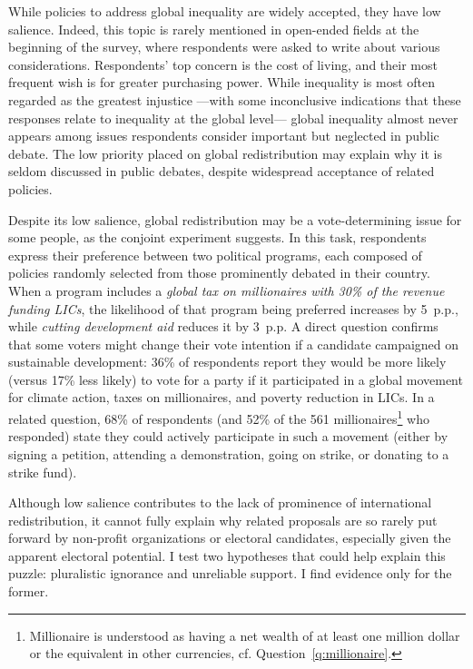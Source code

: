 \documentclass[12pt,english]{article}
\begin{document}
\begin{bibunit}
While policies to address global inequality are widely accepted, they have low salience. Indeed, this topic is rarely mentioned in open-ended fields at the beginning of the survey, where respondents were asked to write about various considerations. Respondents' top concern is the cost of living, and their most frequent wish is for greater purchasing power. While inequality is most often regarded as the greatest injustice ---with some inconclusive indications that these responses relate to inequality at the global level--- global inequality almost never appears among issues respondents consider important but neglected in public debate. The low priority placed on global redistribution may explain why it is seldom discussed in public debates, despite widespread acceptance of related policies.

Despite its low salience, global redistribution may be a vote-determining issue for some people, as %
the conjoint experiment suggests. 
In this task, respondents express their preference between two political programs, each composed of policies randomly selected from those prominently debated in their country. When a program includes a \textit{global tax on millionaires with 30\% of the revenue funding LICs}, the likelihood of that program being preferred increases by 5~p.p., while \textit{cutting development aid} reduces it by 3~p.p.  A direct question confirms that some voters might change their vote intention if a candidate campaigned on sustainable development: 36\% of respondents report they would be more likely (versus 17\% less likely) to vote for a party if it participated in a global movement for climate action, taxes on millionaires, and poverty reduction in LICs. In a related question, 68\% of respondents (and 52\% of the 561 millionaires\footnote{Millionaire is understood as having a net wealth of at least one million dollar or the equivalent in other currencies, cf. Question~\ref{q:millionaire}.} %
who responded) state they could actively participate in such a movement (either by signing a petition, attending a demonstration, going on strike, or donating to a strike fund). 

Although low salience contributes to the lack of prominence of international redistribution, it cannot fully explain why related proposals are so rarely put forward by non-profit organizations or electoral candidates, especially given the apparent electoral potential. I test two hypotheses that could help explain this puzzle: pluralistic ignorance and unreliable support. I find evidence only for the former.


\end{bibunit}
\end{document}
